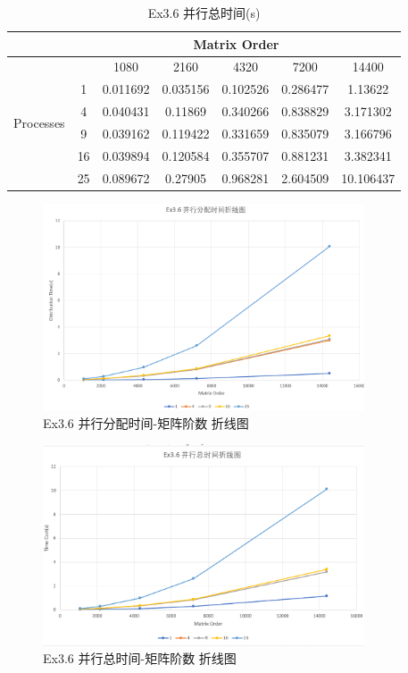 \documentclass[UTF8]{article}
\begin{document}
\begin{table}[h]
    \caption{Ex3.6 并行总时间(s)}
    \label{tab:my-table}
    \centering
    \scalebox{0.8} {
    \begin{tabular}{|c|c|c|c|c|c|c|}
    \hline
                               & \multicolumn{6}{c|}{Matrix Order}                          \\ \hline
    \multirow{6}{*}{Processes} &    & 1080     & 2160     & 4320     & 7200     & 14400     \\ \cline{2-7} 
                               & 1  & 0.011692 & 0.035156 & 0.102526 & 0.286477 & 1.13622   \\ \cline{2-7} 
                               & 4  & 0.040431 & 0.11869  & 0.340266 & 0.838829 & 3.171302  \\ \cline{2-7} 
                               & 9  & 0.039162 & 0.119422 & 0.331659 & 0.835079 & 3.166796  \\ \cline{2-7} 
                               & 16 & 0.039894 & 0.120584 & 0.355707 & 0.881231 & 3.382341  \\ \cline{2-7} 
                               & 25 & 0.089672 & 0.27905  & 0.968281 & 2.604509 & 10.106437 \\ \hline
    \end{tabular}}
    \end{table}
    \begin{figure}[h]
        \centering
        \includegraphics[width=0.85\textwidth]{36pdo.png}
        \caption{Ex3.6 并行分配时间-矩阵阶数 折线图}
    \end{figure}

    \begin{figure}[h]
        \centering
        \includegraphics[width=0.85\textwidth]{36pao.png}
        \caption{Ex3.6 并行总时间-矩阵阶数 折线图}
    \end{figure}
\end{document}

